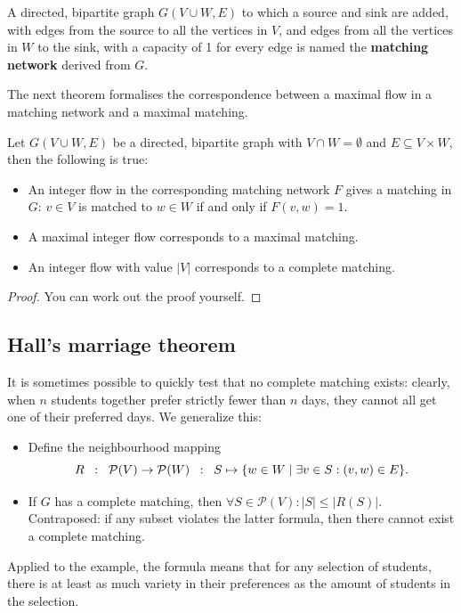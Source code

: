 A directed, bipartite graph $G(V \cup W,E)$ to which a source and sink
are added, with edges from the source to all the vertices in $V$, and edges from
all the vertices in $W$ to the sink, with a capacity of 1 for every
edge is named the \textbf{matching network} derived from $G$.


The next theorem formalises the correspondence between a maximal
flow in a matching network and a maximal matching.

 \begin{theorem}
Let $G(V \cup W,E)$ be a directed, bipartite graph
with $V \cap W = \emptyset$ and $E \subseteq V \times W$, then the
following is true:
	\begin{itemize}
		\item An integer flow in the corresponding matching network $F$ gives a
		matching in $G$: $v \in V$ is matched to $w \in W$ if and only if
		$F(v,w) = 1$.
		
		\item A maximal integer flow corresponds to a maximal matching.
		
		\item An integer flow with value $|V|$ corresponds to a complete matching.	
	\end{itemize}
\end{theorem}
\begin{proof}
You can work out the proof yourself.
\end{proof}

\subsection{Hall's marriage theorem}
It is sometimes possible to quickly test that no complete matching
exists: clearly, when $n$ students together prefer strictly fewer than
$n$ days, they cannot all get one of their preferred days. We generalize this:

\begin{itemize}
\item Define the neighbourhood mapping 
\begin{equation*}
R\;\;:\;\; {\cal P}(V) \rightarrow {\cal P}(W) \;\;:\;\; S \mapsto \{w\in W \mid \exists v \in S : (v,w) \in E\}.
\end{equation*}

\item If $G$ has a complete matching, then $\forall S\in \mathcal{P}(V) : |S| \leq |R(S)|$. Contraposed: if any subset violates the latter formula, then there cannot exist a complete matching.
\end{itemize}
Applied to the example, the formula means that for any selection of students, there is at least as much variety in their preferences as the amount of students in the selection.

